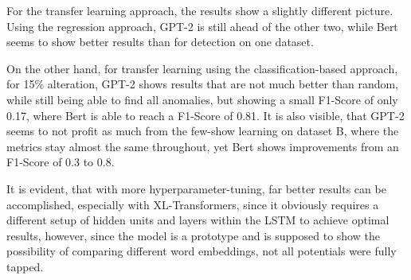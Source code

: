 For the transfer learning approach, the results show a slightly different picture. Using the regression approach, GPT-2 is still ahead of the other two, while Bert seems to show better results than for detection on one dataset. 

On the other hand, for transfer learning using the classification-based approach, for 15\% alteration, GPT-2 shows results that are not much better than random, while still being able to find all anomalies, but showing a small F1-Score of only 0.17, where Bert is able to reach a F1-Score of 0.81. It is also visible, that GPT-2 seems to not profit as much from the few-show learning on dataset B, where the metrics stay almost the same throughout, yet Bert shows improvements from an F1-Score of 0.3 to 0.8.

It is evident, that with more hyperparameter-tuning, far better results can be accomplished, especially with XL-Transformers, since it obviously requires a different setup of hidden units and layers within the LSTM to achieve optimal results, however, since the model is a prototype and is supposed to show the possibility of comparing different word embeddings, not all potentials were fully tapped.

